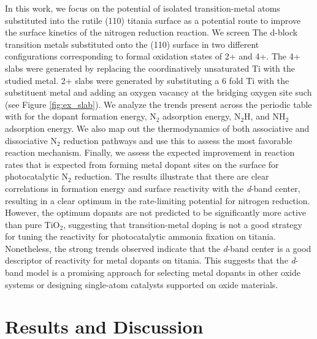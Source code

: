 In this work, we focus on the potential of isolated transition-metal atoms substituted into the rutile (110) titania surface as a potential route to improve the surface kinetics of the nitrogen reduction reaction. We screen The d-block transition metals substituted onto the (110) surface in two different configurations corresponding to formal oxidation states of 2+ and 4+. The 4+ slabs were generated by replacing the coordinatively unsaturated Ti with the studied metal. 2+ slabs were generated by substituting a 6 fold Ti with the substituent metal and adding an oxygen vacancy at the bridging oxygen site such (see Figure \ref{fig:ex_slab}). We analyze the trends present across the periodic table with for the dopant formation energy, N$_2$ adsorption energy, N$_2$H, and NH$_2$ adsorption energy. We also map out the thermodynamics of both associative and dissociative N$_2$ reduction pathways and use this to assess the most favorable reaction mechanism. Finally, we assess the expected improvement in reaction rates that is expected from forming metal dopant sites on the surface for photocatalytic N$_2$ reduction. The results illustrate that there are clear correlations in formation energy and surface reactivity with the \textit{d}-band center, resulting in a clear optimum in the rate-limiting potential for nitrogen reduction. However, the optimum dopants are not predicted to be significantly more active than pure TiO$_2$, suggesting that transition-metal doping is not a good strategy for tuning the reactivity for photocatalytic ammonia fixation on titania. Nonetheless, the strong trends observed indicate that the \textit{d}-band center is a good descriptor of reactivity for metal dopants on titania. This suggests that the \textit{d}-band model is a promising approach for selecting metal dopants in other oxide systems or designing single-atom catalysts supported on oxide materials.

\section{Results and Discussion}

